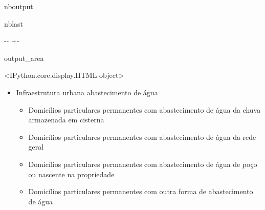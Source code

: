 \documentclass[letterpaper,10pt,brazil]{sphinxmanual}
\newlength\nbsphinxcodecellspacing
\begin{document}
\begin{sphinxuseclass}{nboutput}
\begin{sphinxuseclass}{nblast}
{

\kern-\sphinxverbatimsmallskipamount\kern-\baselineskip
\kern+\FrameHeightAdjust\kern-\fboxrule
\vspace{\nbsphinxcodecellspacing}

\begin{sphinxuseclass}{output_area}
\begin{sphinxuseclass}{}


\begin{sphinxVerbatim}[commandchars=\\\{\}]
\llap{\color{nbsphinxout}[2]:\,\hspace{\fboxrule}\hspace{\fboxsep}}<IPython.core.display.HTML object>
\end{sphinxVerbatim}



\end{sphinxuseclass}
\end{sphinxuseclass}
}

\end{sphinxuseclass}
\end{sphinxuseclass}\begin{itemize}
\item {} 
\sphinxAtStartPar
Infraestrutura urbana \sphinxhyphen{} abastecimento de água
\begin{itemize}
\item {} 
 Domicílios particulares permanentes com abastecimento de água da chuva armazenada em cisterna

\item {} 
 Domicílios particulares permanentes com abastecimento de água da rede geral

\item {} 
 Domicílios particulares permanentes com abastecimento de água de poço ou nascente na propriedade

\item {} 
 Domicílios particulares permanentes com outra forma de abastecimento de água

\end{itemize}

\end{itemize}
\end{document}
